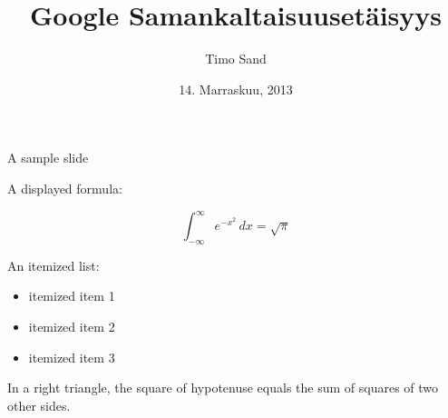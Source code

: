 \documentclass{beamer}
\title[Google Similarity Distance]{Google Samankaltaisuusetäisyys}
\author[T. Sand]{Timo Sand}
\institute[UH]{
  Tietojenkäsittelytieteen laitos\\
  Helsingin Yliopisto\\
  Helsinki\\[1ex]
}
\date[November 2013]{14. Marraskuu, 2013}
\begin{document}
\begin{frame}[plain]
  \titlepage
\end{frame}

\begin{frame}{A sample slide}

A displayed formula:

\[
  \int_{-\infty}^\infty e^{-x^2} \, dx = \sqrt{\pi}
\]

An itemized list:

\begin{itemize}
  \item itemized item 1
  \item itemized item 2
  \item itemized item 3
\end{itemize}

\begin{theorem}
  In a right triangle, the square of hypotenuse equals
  the sum of squares of two other sides.
\end{theorem}

\end{frame}
\end{document}
